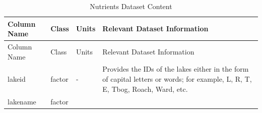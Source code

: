 \documentclass[12pt,]{article}
\begin{document}
\begin{longtable}[]{@{}llll@{}}
\caption{Nutrients Dataset Content}\tabularnewline
\toprule
\begin{minipage}[b]{0.25\columnwidth}\raggedright
Column Name\strut
\end{minipage} & \begin{minipage}[b]{0.13\columnwidth}\raggedright
Class\strut
\end{minipage} & \begin{minipage}[b]{0.12\columnwidth}\raggedright
Units\strut
\end{minipage} & \begin{minipage}[b]{0.38\columnwidth}\raggedright
Relevant Dataset Information\strut
\end{minipage}\tabularnewline
\midrule
\endfirsthead
\toprule
\begin{minipage}[b]{0.25\columnwidth}\raggedright
Column Name\strut
\end{minipage} & \begin{minipage}[b]{0.13\columnwidth}\raggedright
Class\strut
\end{minipage} & \begin{minipage}[b]{0.12\columnwidth}\raggedright
Units\strut
\end{minipage} & \begin{minipage}[b]{0.38\columnwidth}\raggedright
Relevant Dataset Information\strut
\end{minipage}\tabularnewline
\midrule
\endhead
\begin{minipage}[t]{0.25\columnwidth}\raggedright
lakeid\strut
\end{minipage} & \begin{minipage}[t]{0.13\columnwidth}\raggedright
factor\strut
\end{minipage} & \begin{minipage}[t]{0.12\columnwidth}\raggedright
-\strut
\end{minipage} & \begin{minipage}[t]{0.38\columnwidth}\raggedright
Provides the IDs of the lakes either in the form of capital letters or
words; for example, L, R, T, E, Tbog, Roach, Ward, etc.\strut
\end{minipage}\tabularnewline
\begin{minipage}[t]{0.25\columnwidth}\raggedright
lakename\strut
\end{minipage} & \begin{minipage}[t]{0.13\columnwidth}\raggedright
factor\strut
\end{minipage} & \begin{minipage}[t]{0.12\columnwidth}\raggedright

\end{minipage}
\end{longtable}
\end{document}
